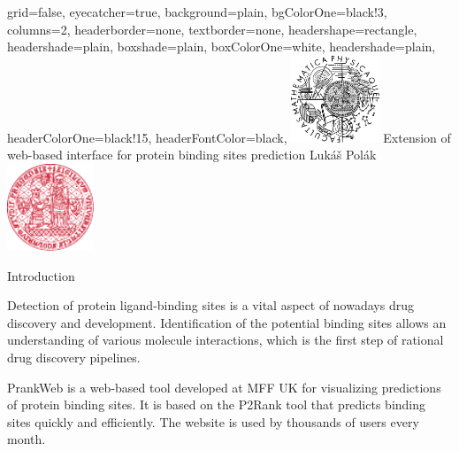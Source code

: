 \documentclass[portrait,a0paper,fontscale=0.25]{baposter}
\begin{document}
\color{black!80} %
\begin{poster}{grid=false,
	eyecatcher=true,
	background=plain,
	bgColorOne=black!3, %
	columns=2,
	headerborder=none,
	textborder=none,
	headershape=rectangle,
	headershade=plain,
	boxshade=plain,
	boxColorOne=white,
	headershade=plain,
	headerColorOne=black!15, %
	headerFontColor=black,
	}%
	{\includegraphics[height=7em]{logos/mff-black.pdf}}
	{Extension of web-based interface for protein binding sites prediction}
	{\vspace{1ex} Lukáš Polák}
	{\includegraphics[height=7em]{logos/uk-red.pdf}}


%
%

\begin{posterbox}[column=0,name=intro]{Introduction}

Detection of protein ligand-binding sites is a vital aspect of nowadays drug
discovery and development. Identification of the potential binding sites allows an
understanding of various molecule interactions, which is the first step of rational
drug discovery pipelines.

PrankWeb is a web-based tool developed at MFF UK for visualizing predictions of protein binding sites. It is based on the P2Rank tool that predicts binding sites quickly and efficiently. The website is used by thousands of users every month.


\end{posterbox}


\end{poster}
\end{document}
